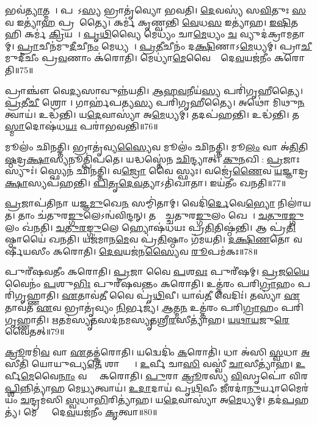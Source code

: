 𑌭𑌵॑\ul{𑌤𑍍𑌯𑌾}𑌤𑍍𑌮𑌨𑌾᳚।
𑌪𑌰𑌾᳚𑌽\ul{𑌸𑍍𑌯} 𑌭𑍍𑌰𑌾𑌤𑍃॑𑌵𑍍𑌯𑍋 𑌭𑌵𑌤𑌿।
\ul{𑌦𑍇}𑌵𑌸𑍍𑌯॑ 𑌸\ul{𑌵𑌿}𑌤𑍁𑌃 \ul{𑌸}𑌵 𑌇𑌤𑍍𑌯𑌾॑\ul{𑌹} 𑌪𑍍𑌰𑌸𑍂᳚𑌤𑍍𑌯𑍈।
𑌕𑌰𑍍𑌮॑ 𑌕𑍃𑌣𑍍𑌵𑌨𑍍𑌤𑌿 \ul{𑌵𑍇}𑌧\ul{𑌸} 𑌇𑌤𑍍𑌯𑌾॑𑌹।
\ul{𑌇}\ul{𑌷𑌿}𑌤 𑌹𑌿 𑌕𑌰𑍍𑌮॑ \ul{𑌕𑍍𑌰𑌿}𑌯𑌤𑍇᳚।
\ul{𑌪𑍃}\ul{𑌥𑌿}𑌵𑍍𑌯𑍈 𑌮𑍇𑌧𑍍𑌯𑌂॑ 𑌚𑌾\ul{𑌮𑍇}𑌧𑍍𑌯𑌂 \ul{𑌚} 𑌵𑍍𑌯𑍁𑌦॑𑌕𑍍𑌰𑌾𑌮𑌤𑌾𑌮𑍍।
\ul{𑌪𑍍𑌰𑌾}𑌚𑍀𑌨॑𑌮𑍁\ul{𑌦𑍀}𑌚𑍀\ul{𑌨𑌂} 𑌮𑍇𑌧𑍍𑌯𑌮𑍍᳚।
\ul{𑌪𑍍𑌰}\ul{𑌤𑍀}𑌚𑍀𑌨𑌂॑ 𑌦\ul{𑌕𑍍𑌷𑌿}𑌣𑌾\-𑌽\ul{𑌮𑍇}𑌧𑍍𑌯𑌮𑍍।
𑌪𑍍𑌰𑌾\ul{𑌚𑍀}𑌮𑍁𑌦𑍀॑𑌚𑍀𑌂 𑌪𑍍𑌰\ul{𑌵}𑌣𑌾𑌂 𑌕॑𑌰𑍋𑌤𑌿।
𑌮𑍇𑌧𑍍𑌯𑌾॑\ul{𑌮𑍇}𑌵𑍈𑌨𑌾𑌂᳚ 𑌦𑍇\ul{𑌵}𑌯𑌜॑𑌨𑍀𑌂 𑌕𑌰𑍋𑌤𑌿॥75॥

𑌪𑍍𑌰𑌾𑌞𑍍𑌚𑍗॑ 𑌵𑍇\ul{𑌦𑍍𑌯}\ul{}𑌸𑌾𑌵𑍁𑌨𑍍𑌨॑𑌯𑌤𑌿।
\ul{𑌆}\ul{𑌹}\ul{𑌵}𑌨𑍀𑌯॑\ul{𑌸𑍍𑌯} 𑌪𑌰𑌿॑𑌗𑍃𑌹𑍀𑌤𑍍𑌯𑍈।
\ul{𑌪𑍍𑌰}𑌤𑍀\ul{𑌚𑍀} 𑌶𑍍𑌰𑍋𑌣𑍀᳚।
𑌗𑌾𑌰𑍍𑌹॑𑌪𑌤𑍍𑌯\ul{𑌸𑍍𑌯} 𑌪𑌰𑌿॑𑌗𑍃𑌹𑍀𑌤𑍍𑌯𑍈।
𑌅𑌥𑍋॑ 𑌮𑌿𑌥𑍁\ul{𑌨}𑌤𑍍𑌵𑌾𑌯॑।
𑌉𑌦𑍍𑌧॑𑌨𑍍𑌤𑌿।
𑌯\ul{𑌦𑍇}𑌵𑌾𑌸𑍍𑌯𑌾॑ 𑌅\ul{𑌮𑍇}𑌧𑍍𑌯𑌮𑍍।
𑌤𑌦𑌪॑𑌹𑌨𑍍𑌤𑌿।
𑌉𑌦𑍍𑌧॑𑌨𑍍𑌤𑌿।
𑌤\ul{𑌸𑍍𑌮𑌾}𑌦𑍋𑌷॑𑌧\ul{𑌯𑌃} 𑌪𑌰𑌾॑𑌭𑌵𑌨𑍍𑌤𑌿॥76॥

𑌮𑍂𑌲𑌂॑ 𑌛𑌿𑌨𑌤𑍍𑌤𑌿।
𑌭𑍍𑌰𑌾𑌤𑍃॑𑌵𑍍𑌯\ul{𑌸𑍍𑌯𑍈}𑌵 𑌮𑍂𑌲𑌂॑ 𑌛𑌿𑌨𑌤𑍍𑌤𑌿।
𑌮𑍂\ul{𑌲𑌂} 𑌵𑌾 𑌅॑\ul{𑌤𑌿}𑌤𑌿\ul{𑌷𑍍𑌠}𑌦𑍍𑌰\ul{𑌕𑍍𑌷𑌾}\ul{}𑌸𑍍𑌯𑌨𑍂𑌤𑍍𑌪𑌿॑𑌪𑌤𑍇।
𑌯𑌦𑍍𑌧𑌸𑍍𑌤𑍇॑𑌨 \ul{𑌛𑌿}𑌨𑍍𑌦𑍍𑌯𑌾𑌤𑍍।
\ul{𑌕𑍁}\ul{𑌨}𑌖𑌿𑌨𑍀᳚: \ul{𑌪𑍍𑌰}𑌜𑌾𑌃 𑌸𑍍𑌯𑍁𑌃॑।
𑌸𑍍𑌫𑍍𑌯𑍇𑌨॑ 𑌛𑌿𑌨𑌤𑍍𑌤𑌿।
𑌵\ul{𑌜𑍍𑌰𑍋} 𑌵𑍈 𑌸𑍍𑌫𑍍𑌯𑌃।
𑌵𑌜𑍍𑌰𑍇॑\ul{𑌣𑍈}𑌵 \ul{𑌯}𑌜𑍍𑌞𑌾𑌦𑍍𑌰\ul{𑌕𑍍𑌷𑌾}\ul{}𑌸𑍍𑌯𑌪॑𑌹𑌨𑍍𑌤𑌿।
\ul{𑌪𑌿}\ul{𑌤𑍃}\ul{𑌦𑍇}\ul{𑌵}𑌤𑍍𑌯𑌾\-𑌽𑌤𑌿॑𑌖𑌾𑌤𑌾।
𑌇𑌯॑𑌤𑍀𑌂 𑌖𑌨𑌤𑌿॥77॥

\ul{𑌪𑍍𑌰}𑌜𑌾𑌪॑𑌤𑌿𑌨𑌾 𑌯𑌜𑍍𑌞\ul{𑌮𑍁}𑌖𑍇\ul{𑌨} 𑌸𑌮𑍍𑌮𑌿॑𑌤𑌾𑌮𑍍।
𑌵𑍇𑌦𑌿॑\ul{𑌰𑍍𑌦𑍇}𑌵𑍇\ul{𑌭𑍍𑌯𑍋} 𑌨𑌿𑌲𑌾॑𑌯𑌤।
𑌤𑌾𑌂 𑌚॑𑌤𑍁𑌰\ul{𑌙𑍍𑌗𑍁}𑌲𑍇\-𑌽𑌨𑍍𑌵॑𑌵𑌿𑌨𑍍𑌦𑌨𑍍।
𑌤𑌸𑍍𑌮𑌾᳚𑌚𑍍𑌚𑌤𑍁𑌰\ul{𑌙𑍍𑌗𑍁}𑌲𑌂 𑌖𑍇𑌯𑌾᳚।
\ul{𑌚}\ul{𑌤𑍁}\ul{𑌰}\ul{𑌙𑍍𑌗𑍁}𑌲𑌂 𑌖॑𑌨𑌤𑌿।
\ul{𑌚}\ul{𑌤𑍁}\ul{𑌰}\ul{𑌙𑍍𑌗𑍁}𑌲𑍇 𑌹𑍍𑌯𑍋𑌷॑𑌧𑌯𑌃 𑌪𑍍𑌰\ul{𑌤𑌿}𑌤𑌿𑌷𑍍𑌠॑𑌨𑍍𑌤𑌿।
𑌆 𑌪𑍍𑌰॑\ul{𑌤𑌿}𑌷𑍍𑌠𑌾𑌯𑍈॑ 𑌖𑌨𑌤𑌿।
𑌯𑌜॑𑌮𑌾𑌨\ul{𑌮𑍇}𑌵 𑌪𑍍𑌰॑\ul{𑌤𑌿}𑌷𑍍𑌠𑌾𑌂 𑌗॑𑌮𑌯𑌤𑌿।
\ul{𑌦}\ul{𑌕𑍍𑌷𑌿}\ul{𑌣}𑌤𑍋 𑌵𑌰𑍍\mbox{}𑌷𑍀॑𑌯𑌸𑍀𑌂 𑌕𑌰𑍋𑌤𑌿।
\ul{𑌦𑍇}\ul{𑌵}𑌯𑌜॑𑌨\ul{𑌸𑍍𑌯𑍈}𑌵 \ul{𑌰𑍂}𑌪𑌮॑𑌕𑌃॥78॥

𑌪𑍁𑌰𑍀॑𑌷𑌵𑌤𑍀𑌂 𑌕𑌰𑍋𑌤𑌿।
\ul{𑌪𑍍𑌰}𑌜𑌾 𑌵𑍈 \ul{𑌪}𑌶\ul{𑌵𑌃} 𑌪𑍁𑌰𑍀॑𑌷𑌮𑍍।
\ul{𑌪𑍍𑌰}𑌜\ul{𑌯𑍈}𑌵𑍈𑌨𑌂॑ \ul{𑌪}𑌶𑍁\ul{𑌭𑌿𑌃} 𑌪𑍁𑌰𑍀॑𑌷𑌵𑌨𑍍𑌤𑌂 𑌕𑌰𑍋𑌤𑌿।
𑌉𑌤𑍍𑌤॑𑌰𑌂 𑌪𑌰𑌿\ul{𑌗𑍍𑌰𑌾}𑌹𑌂 𑌪𑌰𑌿॑𑌗𑍃𑌹𑍍𑌣𑌾𑌤𑌿।
\ul{𑌏}𑌤𑌾𑌵॑\ul{𑌤𑍀} 𑌵𑍈 𑌪𑍃॑\ul{𑌥𑌿}𑌵𑍀।
𑌯𑌾𑌵॑\ul{𑌤𑍀} 𑌵𑍇𑌦𑌿𑌃॑।
𑌤𑌸𑍍𑌯𑌾॑ \ul{𑌏}𑌤𑌾𑌵॑𑌤 \ul{𑌏}𑌵 𑌭𑍍𑌰𑌾𑌤𑍃॑𑌵𑍍𑌯𑌂 \ul{𑌨𑌿}𑌰𑍍𑌭𑌜𑍍𑌯॑।
\ul{𑌆}𑌤𑍍𑌮\ul{𑌨} 𑌉𑌤𑍍𑌤॑𑌰𑌂 𑌪𑌰𑌿\ul{𑌗𑍍𑌰𑌾}𑌹𑌂 𑌪𑌰𑌿॑𑌗𑍃𑌹𑍍𑌣𑌾𑌤𑌿।
\ul{𑌋}𑌤𑌮॑𑌸𑍍𑌯𑍃\ul{𑌤}𑌸𑌦॑𑌨𑌮𑌸𑍍𑌯𑍃\ul{𑌤}𑌶𑍍𑌰𑍀\ul{𑌰}𑌸𑍀𑌤𑍍𑌯𑌾॑𑌹।
\ul{𑌯}\ul{𑌥𑌾}\ul{𑌯}𑌜𑍁\ul{𑌰𑍇}𑌵𑍈𑌤𑌤𑍍॥79॥

\ul{𑌕𑍍𑌰𑍂}𑌰𑌮𑌿॑\ul{𑌵} 𑌵𑌾 \ul{𑌏}𑌤𑌤𑍍𑌕॑𑌰𑍋𑌤𑌿।
𑌯𑌦𑍍𑌵𑍇𑌦𑌿𑌂॑ \ul{𑌕}𑌰𑍋𑌤𑌿॑।
𑌧𑌾 𑌅॑𑌸𑌿 \ul{𑌸𑍍𑌵}𑌧𑌾 \ul{𑌅}𑌸𑍀𑌤𑌿॑ 𑌯𑍋𑌯𑍁𑌪𑍍𑌯\ul{𑌤𑍇} 𑌶𑌾𑌨𑍍𑌤𑍍𑌯𑍈᳚।
\ul{𑌉}𑌰𑍍𑌵𑍀 𑌚𑌾\ul{𑌸𑌿} 𑌵𑌸𑍍𑌵𑍀॑ \ul{𑌚𑌾}𑌸𑍀𑌤𑍍𑌯𑌾॑𑌹।
\ul{𑌉}𑌰𑍍𑌵𑍀\ul{𑌮𑍇}𑌵𑍈\ul{𑌨𑌾𑌂} 𑌵𑌸𑍍𑌵𑍀𑌂᳚ 𑌕𑌰𑍋𑌤𑌿।
\ul{𑌪𑍁}𑌰𑌾 \ul{𑌕𑍍𑌰𑍂}𑌰𑌸𑍍𑌯॑ \ul{𑌵𑌿}𑌸𑍃𑌪𑍋॑ 𑌵𑌿𑌰\ul{𑌪𑍍𑌶𑌿}𑌨𑍍𑌨𑌿𑌤𑍍𑌯𑌾॑𑌹 𑌮𑍇\ul{𑌧𑍍𑌯}𑌤𑍍𑌵𑌾𑌯॑।
\ul{𑌉}\ul{𑌦𑌾}𑌦𑌾𑌯॑ 𑌪𑍃\ul{𑌥𑌿}𑌵𑍀𑌂 \ul{𑌜𑍀}𑌰𑌦𑌾॑\ul{𑌨𑍁}𑌰𑍍𑌯𑌾𑌮𑍈𑌰॑𑌯𑌂 \ul{𑌚}𑌨𑍍𑌦𑍍𑌰𑌮॑𑌸𑌿 \ul{𑌸𑍍𑌵}𑌧𑌾\ul{𑌭𑌿}𑌰𑌿𑌤𑍍𑌯𑌾॑𑌹।
𑌯\ul{𑌦𑍇}𑌵𑌾𑌸𑍍𑌯𑌾॑ 𑌅\ul{𑌮𑍇}𑌧𑍍𑌯𑌮𑍍।
𑌤𑌦॑\ul{𑌪}𑌹𑌤𑍍𑌯॑।
𑌮𑍇𑌧𑍍𑌯𑌾𑌂᳚ 𑌦𑍇\ul{𑌵}𑌯𑌜॑𑌨𑍀𑌂 \ul{𑌕𑍃}𑌤𑍍𑌵𑌾॥80॥

